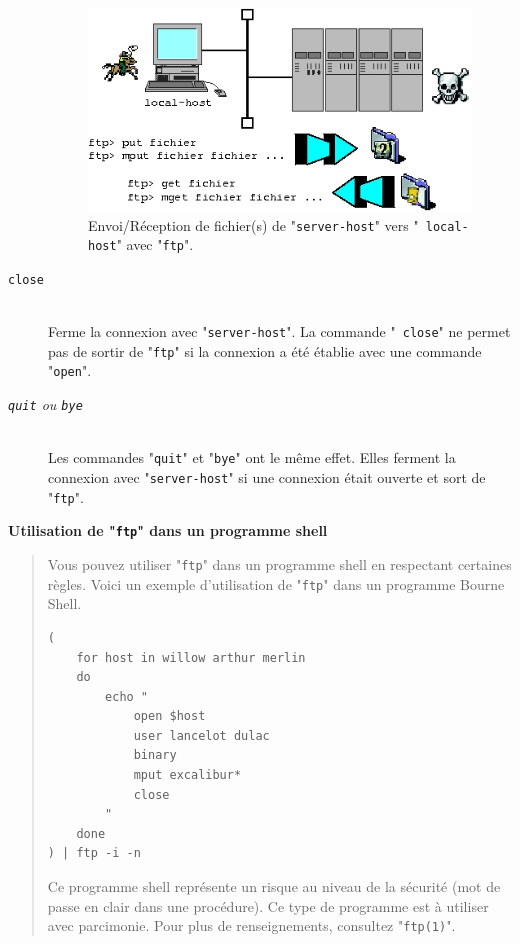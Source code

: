 \begin{description}
	\begin{figure}[hbtp]
	\centering
	\includegraphics{./_Images/cmds-net/ftpexch.jpg}
	\caption{\label{fig-cmdnet-ftpexch}Envoi/R{\'e}ception de fichier(s) de
	"{\tt server-host}" vers "~{\tt local-host}" avec "{\tt ftp}".}
	\end{figure}

	\item[{\tt close}]\mbox{}\\
	Ferme la connexion avec "{\tt server-host}". La commande "{\tt
	close}" ne permet pas de sortir de "{\tt ftp}" si la connexion a {\'e}t{\'e}
	{\'e}tablie avec une commande "{\tt open}".

	\item[{\sl {\tt quit} ou {\tt bye}}]\mbox{}\\
	Les commandes "{\tt quit}" et "{\tt bye}" ont le m{\^e}me effet.
	Elles ferment la connexion avec "{\tt server-host}" si une
	connexion {\'e}tait ouverte et sort de "{\tt ftp}".
\end{description}

\begin{example}
{\bf Utilisation de "{\tt ftp}" dans un programme shell}
\begin{quote}
Vous pouvez utiliser "{\tt ftp}" dans un programme shell en respectant
certaines r{\`e}gles. Voici un exemple d'utilisation de "{\tt ftp}" dans un
programme Bourne Shell.

\begin{verbatim}
(
    for host in willow arthur merlin
    do
        echo "
            open $host
            user lancelot dulac
            binary
            mput excalibur*
            close
        "
    done
) | ftp -i -n
\end{verbatim}

Ce programme shell repr{\'e}sente un risque au niveau de la s{\'e}curit{\'e} (mot de
passe en clair dans une proc{\'e}dure). Ce type de programme est {\`a} utiliser
avec parcimonie. Pour plus de renseignements, consultez "{\tt ftp(1)}".
\end{quote}
\end{example}

